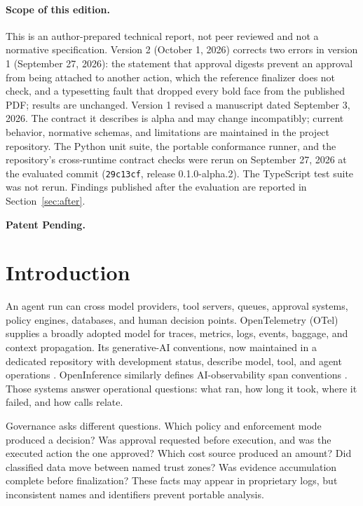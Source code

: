 \documentclass[10pt,letterpaper]{article}
\begin{document}
\paragraph{Scope of this edition.}
This is an author-prepared technical report, not peer reviewed and not a normative specification. Version 2 (October 1, 2026) corrects two errors in version 1 (September 27, 2026): the statement that approval digests prevent an approval from being attached to another action, which the reference finalizer does not check, and a typesetting fault that dropped every bold face from the published PDF; results are unchanged. Version 1 revised a manuscript dated September 3, 2026. The contract it describes is alpha and may change incompatibly; current behavior, normative schemas, and limitations are maintained in the project repository. The Python unit suite, the portable conformance runner, and the repository's cross-runtime contract checks were rerun on September 27, 2026 at the evaluated commit (\texttt{29c13cf}, release 0.1.0-alpha.2). The TypeScript test suite was not rerun. Findings published after the evaluation are reported in Section~\ref{sec:after}.

\noindent\textbf{Patent Pending.}

\section{Introduction}

An agent run can cross model providers, tool servers, queues, approval systems, policy engines, databases, and human decision points. OpenTelemetry (OTel) supplies a broadly adopted model for traces, metrics, logs, events, baggage, and context propagation. Its generative-AI conventions, now maintained in a dedicated repository with development status, describe model, tool, and agent operations \citep{otelgenai}. OpenInference similarly defines AI-observability span conventions \citep{openinference}. Those systems answer operational questions: what ran, how long it took, where it failed, and how calls relate.

Governance asks different questions. Which policy and enforcement mode produced a decision? Was approval requested before execution, and was the executed action the one approved? Which cost source produced an amount? Did classified data move between named trust zones? Was evidence accumulation complete before finalization? These facts may appear in proprietary logs, but inconsistent names and identifiers prevent portable analysis.
\end{document}
